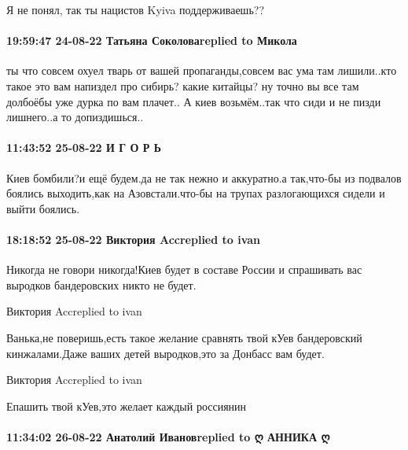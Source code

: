 Я не понял, так ты нацистов Kyiva поддерживаешь??

\paragraph{19:59:47 24-08-22 Татьяна Соколоваreplied to Микола}



ты что совсем охуел тварь от вашей пропаганды,совсем вас ума там лишили..кто
такое это вам напиздел про сибирь? какие китайцы? ну точно вы все там долбоёбы
уже дурка по вам плачет.. А киев возьмём..так что сиди и не пизди лишнего..а то
допиздишься..

\paragraph{11:43:52 25-08-22 И Г О Р Ь}

Киев бомбили?и ещё будем.да не так нежно и аккуратно.а так,что-бы из подвалов
боялись выходить,как на Азовстали.что-бы на трупах разлогающихся сидели и выйти
боялись.

\paragraph{18:18:52 25-08-22 Виктория Accreplied to ivan}

Никогда не говори никогда!Киев будет в составе России и спрашивать вас выродков
бандеровских никто не будет.

Виктория Accreplied to ivan

Ванька,не поверишь,есть такое желание сравнять твой кУев бандеровский
кинжалами.Даже ваших детей выродков,это за Донбасс вам будет.

Виктория Accreplied to ivan

Епашить твой кУев,это желает каждый россиянин

\paragraph{11:34:02 26-08-22 Анатолий Ивановreplied to ღ АННИКА ღ}

